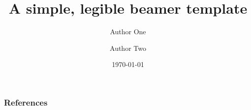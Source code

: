 




\title[Beamer template]{A simple, legible beamer template}

\author{Author One \and Author Two}


\date{\today} 
















\begin{frame}[t,allowframebreaks]
\frametitle{References}

\footnotesize
\begingroup
\renewcommand{\section}[2]{}

\endgroup
\normalsize

\end{frame}



